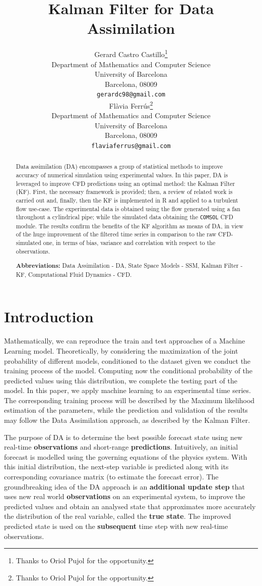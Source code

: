 \documentclass{article}
\title{Kalman Filter for Data Assimilation}
\author{%
  Gerard Castro Castillo\thanks{Thanks to Oriol Pujol for the opportunity.} \\
  Department of Mathematics and Computer Science\\
  University of Barcelona\\
  Barcelona, 08009 \\
  \texttt{gerardc98@gmail.com} \\
  \And
  Flàvia Ferrús\thanks{Thanks to Oriol Pujol for the opportunity.} \\
  Department of Mathematics and Computer Science\\
  University of Barcelona\\
  Barcelona, 08009 \\
  \texttt{flaviaferrus@gmail.com} \\
}
\theoremstyle{definition}
\theoremstyle{definition}
\theoremstyle{remark}
\theoremstyle{mythmstyle}
\begin{document}
\maketitle

\begin{abstract}
  Data assimilation (DA) encompasses a group of statistical methods to improve accuracy of numerical simulation using experimental values. 
  In this paper, DA is leveraged to improve CFD predictions using an optimal method: the Kalman Filter (KF). First, the necessary framework is provided; then, a review of related work is carried out and, finally, then the KF is implemented in R and applied to a turbulent flow use-case. The experimental data is obtained using the flow generated using a fan throughout a cylindrical pipe; while the simulated data obtaining the \texttt{COMSOL} CFD module. 
  The results confirm the benefits of the KF algorithm as means of DA, in view of the huge improvement of the filtered time series in comparison to the raw CFD-simulated one, in terms of bias, variance and correlation with respect to the observations.

  \textbf{Abbreviations:} Data Assimilation - DA, State Space Models - SSM, Kalman Filter - KF, Computational Fluid Dynamics - CFD.
\end{abstract}

\section{Introduction}

Mathematically, we can reproduce the train and test approaches of a Machine Learning model. Theoretically, by considering the maximization of the joint probability of different models, conditioned to the dataset given we conduct the training process of the model. Computing now the conditional probability of the predicted values using this distribution, we complete the testing part of the model. In this paper, we apply machine learning to an experimental time series. The corresponding training process will be described by the Maximum likelihood estimation of the parameters, while the prediction and validation of the results may follow the Data Assimilation approach, as described by the Kalman Filter.  

The purpose of DA is to determine the best possible forecast state using new real-time \textbf{observations} and short-range \textbf{predictions}. Intuitively, an initial forecast is modelled using the governing equations of the physics system. With this initial distribution, the next-step variable is predicted along with its corresponding covariance matrix (to estimate the forecast error). The groundbreaking idea of the DA approach is an \textbf{additional update step} that uses new real world \textbf{observations} on an experimental system, to improve the predicted values and obtain an analysed state that approximates more accurately the distribution of the real variable, called the \textbf{true state}. The improved predicted state is used on the \textbf{subsequent} time step with new real-time observations.
\end{document}

